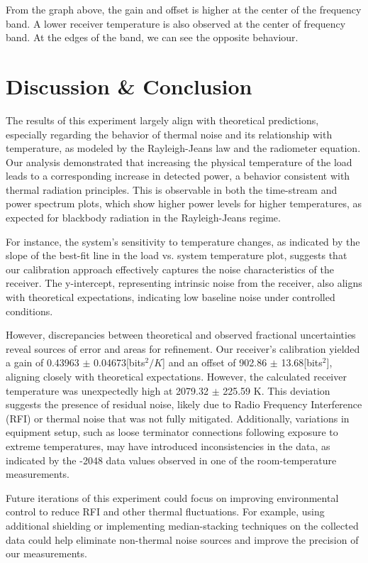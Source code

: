 \documentclass[10pt, preprint]{aastex}
\begin{document}
From the graph above, the gain and offset is higher at the center of the frequency band. A lower receiver temperature is also observed at the center of frequency band. At the edges of the band, we can see the opposite behaviour.

\section{Discussion \& Conclusion}\label{sec:conclusion}

The results of this experiment largely align with theoretical predictions, especially regarding the behavior of thermal noise and its relationship with temperature, as modeled by the Rayleigh-Jeans law and the radiometer equation. Our analysis demonstrated that increasing the physical temperature of the load leads to a corresponding increase in detected power, a behavior consistent with thermal radiation principles. This is observable in both the time-stream and power spectrum plots, which show higher power levels for higher temperatures, as expected for blackbody radiation in the Rayleigh-Jeans regime.

For instance, the system's sensitivity to temperature changes, as indicated by the slope of the best-fit line in the load vs. system temperature plot, suggests that our calibration approach effectively captures the noise characteristics of the receiver. The y-intercept, representing intrinsic noise from the receiver, also aligns with theoretical expectations, indicating low baseline noise under controlled conditions.

However, discrepancies between theoretical and observed fractional uncertainties reveal sources of error and areas for refinement. Our receiver's calibration yielded a gain of 
0.43963 $\pm$ 0.04673[bits$^2/K$] and an offset of 902.86 $\pm$
13.68[bits$^2$], aligning closely with theoretical expectations. However, the calculated receiver temperature was unexpectedly high at 2079.32 $\pm$ 225.59 K. This deviation suggests the presence of residual noise, likely due to Radio Frequency Interference (RFI) or thermal noise that was not fully mitigated. Additionally, variations in equipment setup, such as loose terminator connections following exposure to extreme temperatures, may have introduced inconsistencies in the data, as indicated by the -2048 data values observed in one of the room-temperature measurements.

Future iterations of this experiment could focus on improving environmental control to reduce RFI and other thermal fluctuations. For example, using additional shielding or implementing median-stacking techniques on the collected data could help eliminate non-thermal noise sources and improve the precision of our measurements.
\end{document}
